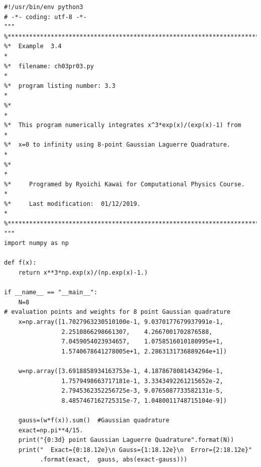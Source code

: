 
\bigskip
\noindent
\program
\label{python:gauss-lagurre}
\footnotesize
\begin{verbatim}
#!/usr/bin/env python3
# -*- coding: utf-8 -*-
"""
%**************************************************************************
%*  Example  3.4                                                          *
%*  filename: ch03pr03.py                                                 *
%*  program listing number: 3.3                                           *
%*                                                                        *
%*  This program numerically integrates x^3*exp(x)/(exp(x)-1) from        *
%*  x=0 to infinity using 8-point Gaussian Laguerre Quadrature.           *
%*                                                                        *
%*     Programed by Ryoichi Kawai for Computational Physics Course.       *
%*     Last modification:  01/12/2019.                                    *
%**************************************************************************
"""
import numpy as np

def f(x):
    return x**3*np.exp(x)/(np.exp(x)-1.)

if __name__ == "__main__":    
    N=8
# evaluation points and weights for 8 point Gaussian quadrature
    x=np.array([1.7027963230510100e-1, 9.0370177679937991e-1,
                2.2510866298661307,    4.2667001702876588,
                7.0459054023934657,    1.0758516010180995e+1,
                1.5740678641278005e+1, 2.2863131736889264e+1])

    w=np.array([3.6918858934163753e-1, 4.1878678081434296e-1,
                1.7579498663717181e-1, 3.3343492261215652e-2,
                2.7945362352256725e-3, 9.0765087733582131e-5,
                8.4857467162725315e-7, 1.0480011748715104e-9])

    gauss=(w*f(x)).sum()  #Gaussian quadrature
    exact=np.pi**4/15.
    print("{0:3d} point Gaussian Laguerre Quadrature".format(N))
    print("  Exact={0:18.12e}\n Gauss={1:18.12e}\n  Error={2:18.12e}"
          .format(exact,  gauss, abs(exact-gauss)))
\end{verbatim}
\normalsize

\newpage





\vfill

